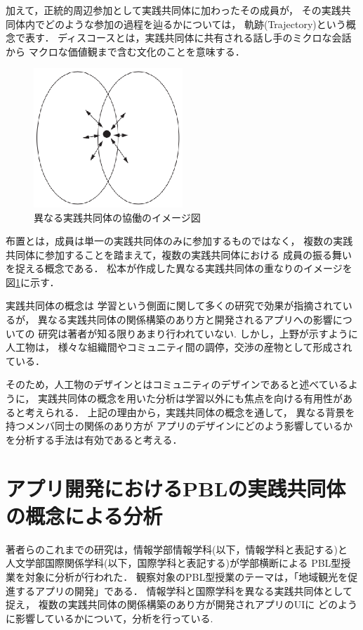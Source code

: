 \documentclass[submit,techrep]{ipsj}
\begin{document}
加えて，正統的周辺参加として実践共同体に加わったその成員が，
その実践共同体内でどのような参加の過程を辿るかについては，
軌跡(Trajectory)という概念で表す．
ディスコースとは，実践共同体に共有される話し手のミクロな会話から
マクロな価値観まで含む文化のことを意味する\cite{book11}．
\begin{figure}[h]
  \centering
  \includegraphics[width=0.5\textwidth]{img/overlap.eps}
  \caption{異なる実践共同体の協働のイメージ図}
  \label{overlap}
\end{figure}


布置とは，成員は単一の実践共同体のみに参加するものではなく，
複数の実践共同体に参加することを踏まえて，複数の実践共同体における
成員の振る舞いを捉える概念である\cite{book12}．
松本\cite{book12}が作成した異なる実践共同体の重なりのイメージを図\ref{overlap}に示す．




実践共同体の概念は
学習という側面に関して多くの研究で効果が指摘されているが，
異なる実践共同体の関係構築のあり方と開発されるアプリへの影響についての
研究は著者が知る限りあまり行われていない.
しかし，上野\cite{book13}が示すように人工物は，
様々な組織間やコミュニティ間の調停，交渉の産物として形成されている．


そのため，人工物のデザインとはコミュニティのデザインであると述べているように，
実践共同体の概念を用いた分析は学習以外にも焦点を向ける有用性があると考えられる．
上記の理由から，実践共同体の概念を通して，
異なる背景を持つメンバ同士の関係のあり方が
アプリのデザインにどのよう影響しているかを分析する手法は有効であると考える．

\section{アプリ開発におけるPBLの実践共同体の概念による分析}
\label{previous-research-pbl}

著者らのこれまでの研究は，情報学部情報学科(以下，情報学科と表記する)と
人文学部国際関係学科(以下，国際学科と表記する)が学部横断による
PBL型授業を対象に分析が行われた．
観察対象のPBL型授業のテーマは，「地域観光を促進するアプリの開発」である．
情報学科と国際学科を異なる実践共同体として捉え，
複数の実践共同体の関係構築のあり方が開発されアプリのUIに
どのように影響しているかについて，分析を行っている.
\end{document}
